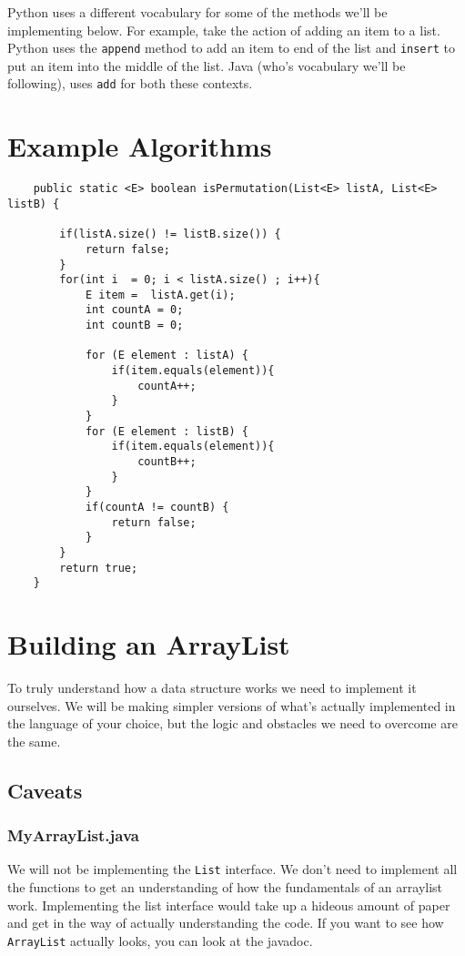 Python uses a different vocabulary for some of the methods we'll be implementing below.  
For example, take the action of adding an item to a list.
Python uses the \texttt{append} method to add an item to end of the list and \texttt{insert} to put an item into the middle of the list.
Java (who's vocabulary we'll be following), uses \texttt{add} for both these contexts. 









\section{Example Algorithms}


\begin{verbatim}
	public static <E> boolean isPermutation(List<E> listA, List<E> listB) {
		
		if(listA.size() != listB.size()) {
			return false;
		}
		for(int i  = 0; i < listA.size() ; i++){
			E item =  listA.get(i);
			int countA = 0;
			int countB = 0;
			
			for (E element : listA) {
				if(item.equals(element)){
					countA++;
				}
			}
			for (E element : listB) {
				if(item.equals(element)){
					countB++;
				}
			}
			if(countA != countB) {
				return false;
			}
		}
		return true;
	}
\end{verbatim}



\section{Building an ArrayList}
\label{buildingArraylist}
To truly understand how a data structure works we need to implement it ourselves.  We will be making simpler versions of what's actually implemented in the language of your choice, but the logic and obstacles we need to overcome are the same.  

\subsection{Caveats}

\subsubsection{MyArrayList.java}
We will not be implementing the \texttt{List} interface. We don't need to implement all the functions to get an understanding of how the fundamentals of an arraylist work.
Implementing the list interface would take up a hideous amount of paper and get in the way of actually understanding the code.
If you want to see how \texttt{ArrayList} actually looks, you can look at the javadoc. 

